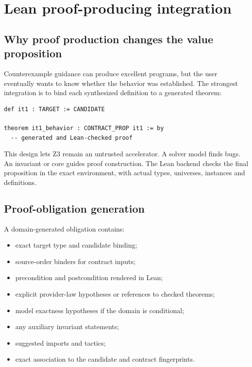 \documentclass[11pt,oneside]{report}
\begin{document}
\chapter{Lean proof-producing integration}
\label{chap:proofs}

\section{Why proof production changes the value proposition}

Counterexample guidance can produce excellent programs, but the user eventually wants to know whether the behavior was established. The strongest integration is to bind each synthesized definition to a generated theorem:

\begin{lstlisting}[language=LeanX,caption={Candidate plus behavioral theorem as the final artifact.}]
def it1 : TARGET := CANDIDATE

theorem it1_behavior : CONTRACT_PROP it1 := by
  -- generated and Lean-checked proof
\end{lstlisting}

This design lets Z3 remain an untrusted accelerator. A solver model finds bugs. An invariant or core guides proof construction. The Lean backend checks the final proposition in the exact environment, with actual types, universes, instances and definitions.

\section{Proof-obligation generation}

A domain-generated obligation contains:

\begin{itemize}[leftmargin=2em]
\item exact target type and candidate binding;
\item source-order binders for contract inputs;
\item precondition and postcondition rendered in Lean;
\item explicit provider-law hypotheses or references to checked theorems;
\item model exactness hypotheses if the domain is conditional;
\item any auxiliary invariant statements;
\item suggested imports and tactics;
\item exact association to the candidate and contract fingerprints.
\end{itemize}
\end{document}
